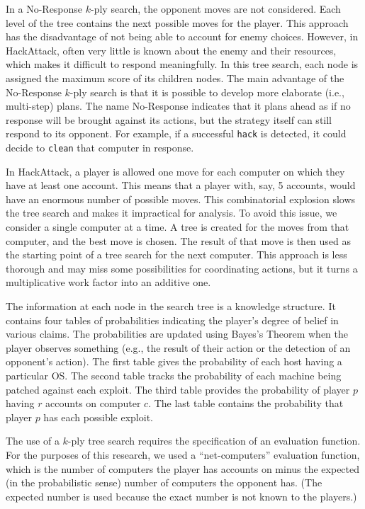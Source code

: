 \documentclass{sig-alternate-05-2015}
\begin{document}
In a No-Response $k$-ply search, the opponent moves are not considered. Each level of the tree contains the next possible moves for the player. This approach has the disadvantage of not being able to account for enemy choices. However, in HackAttack, often very little is known about the enemy and their resources, which makes it difficult to respond meaningfully. In this tree search, each node is assigned the maximum score of its children nodes. The main advantage of the No-Response $k$-ply search is that it is possible to develop more elaborate (i.e., multi-step) plans.
The name No-Response indicates that it plans ahead as if no response will be brought against its actions, but the strategy itself can still respond to its opponent. 
For example, if a successful {\tt hack} is detected, it could decide to {\tt clean} that computer in response.
 
In HackAttack, a player is allowed one move for each computer on which they have at least one account. This means that a player with, say, 5 accounts, would have an enormous number of possible moves. This combinatorial explosion slows the tree search and makes it impractical for analysis. To avoid this issue, we consider a single computer at a time. A tree is created for the moves from that computer, and the best move is chosen. The result of that move is then used as the starting point of a tree search for the next computer. This approach is less thorough and may miss some possibilities for coordinating actions, but it turns a multiplicative work factor into an additive one. 

The information at each node in the search tree is a knowledge structure. It contains four tables of probabilities indicating the player's degree of belief in various claims. 
The probabilities are updated using Bayes's Theorem when the player observes something (e.g., the result of their action or the detection of an opponent's action).
The first table gives the probability of each host having a particular OS. The second table tracks the probability of each machine being patched against each exploit. The third table provides the probability of player $p$ having $r$ accounts on computer $c$. The last table contains the probability that player $p$ has each possible exploit. 

The use of a $k$-ply tree search requires the specification of an evaluation function. For the purposes of this research, we used a ``net-computers'' evaluation function, which is the number of computers the player has accounts on minus the expected (in the probabilistic sense) number of computers the opponent has. (The expected number is used because the exact number is not known to the players.) 
\end{document}
